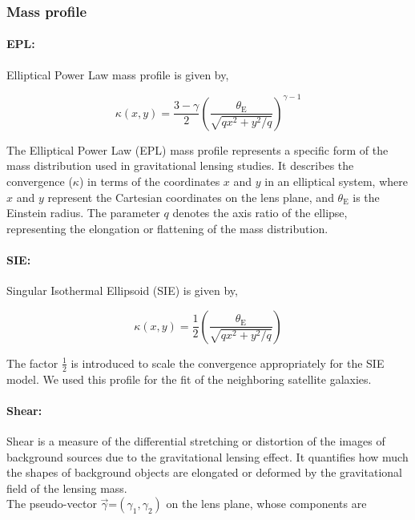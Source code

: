 \documentclass{aa}
\begin{document}
\subsubsection{Mass profile}
\paragraph{{EPL:}}
 Elliptical Power Law mass profile is given by, 

$$
\kappa\left(x, y\right)=\frac{3-\gamma}{2}\left(\frac{\theta_{\mathrm{E}}}{\sqrt{q x^2+y^2 / q}}\right)^{\gamma-1}
$$

The Elliptical Power Law (EPL) mass profile represents a specific form of the mass distribution used in gravitational lensing studies. It describes the convergence (\(\kappa\)) in terms of the coordinates \(x\) and \(y\) in an elliptical system, where \(x\) and \(y\) represent the Cartesian coordinates on the lens plane, and \(\theta_{\mathrm{E}}\) is the Einstein radius. The parameter \(q\) denotes the axis ratio of the ellipse, representing the elongation or flattening of the mass distribution.
\\
\newline
\paragraph{\textbf{SIE:}} Singular Isothermal Ellipsoid (SIE) is given by,

$$
\kappa\left(x, y\right)=\frac{1}{2}\left(\frac{\theta_{\mathrm{E}}}{\sqrt{q x^2+y^2 / q}}\right)
$$

The factor $\frac{1}{2}$ is introduced to scale the convergence appropriately for the SIE model. We used this profile for the fit of the neighboring satellite galaxies.
\\
\newline
\paragraph{\textbf{Shear:}} Shear is a measure of the differential stretching or distortion of the images of background sources due to the gravitational lensing effect. It quantifies how much the shapes of background objects are elongated or deformed by the gravitational field of the lensing mass.\\


The pseudo-vector $\vec{\gamma}$=$(\gamma_1, \gamma_2)$ on the lens plane, whose components are
%
\end{document}
